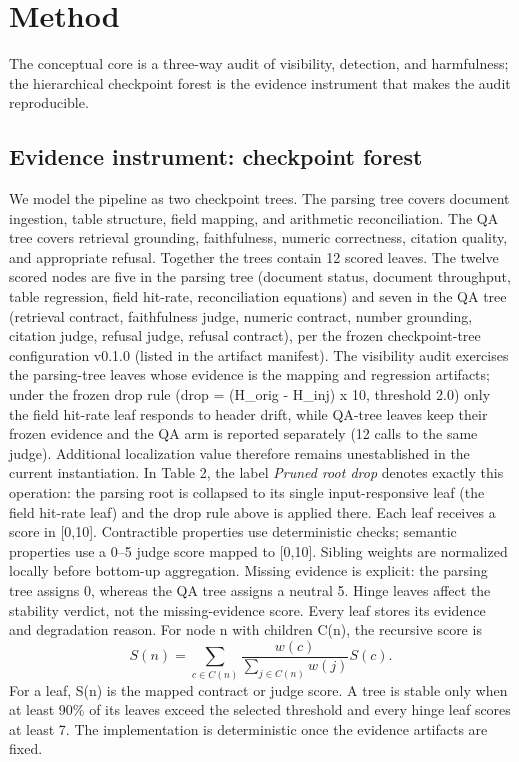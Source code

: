 \documentclass[10pt,conference]{IEEEtran}
\begin{document}
\section{Method}
The conceptual core is a three-way audit of visibility, detection, and harmfulness; the hierarchical checkpoint forest is the evidence instrument that makes the audit reproducible.
\subsection{Evidence instrument: checkpoint forest}
We model the pipeline as two checkpoint trees. The parsing tree covers document ingestion, table structure, field mapping, and arithmetic reconciliation. The QA tree covers retrieval grounding, faithfulness, numeric correctness, citation quality, and appropriate refusal. Together the trees contain 12 scored leaves.
The twelve scored nodes are five in the parsing tree (document status, document throughput, table regression, field hit-rate, reconciliation equations) and seven in the QA tree (retrieval contract, faithfulness judge, numeric contract, number grounding, citation judge, refusal judge, refusal contract), per the frozen checkpoint-tree configuration v0.1.0 (listed in the artifact manifest). The visibility audit exercises the parsing-tree leaves whose evidence is the mapping and regression artifacts; under the frozen drop rule (drop = (H\_orig - H\_inj) x 10, threshold 2.0) only the field hit-rate leaf responds to header drift, while QA-tree leaves keep their frozen evidence and the QA arm is reported separately (12 calls to the same judge). Additional localization value therefore remains unestablished in the current instantiation. In Table 2, the label \emph{Pruned root drop} denotes exactly this operation: the parsing root is collapsed to its single input-responsive leaf (the field hit-rate leaf) and the drop rule above is applied there.
Each leaf receives a score in [0,10]. Contractible properties use deterministic checks; semantic properties use a 0–5 judge score mapped to [0,10]. Sibling weights are normalized locally before bottom-up aggregation. Missing evidence is explicit: the parsing tree assigns 0, whereas the QA tree assigns a neutral 5. Hinge leaves affect the stability verdict, not the missing-evidence score. Every leaf stores its evidence and degradation reason.
For node n with children C(n), the recursive score is
\[
S(n)=\sum_{c\in C(n)} \frac{w(c)}{\sum_{j\in C(n)}w(j)}S(c).
\]
For a leaf, S(n) is the mapped contract or judge score. A tree is stable only when at least 90\% of its leaves exceed the selected threshold and every hinge leaf scores at least 7. The implementation is deterministic once the evidence artifacts are fixed.
\end{document}
